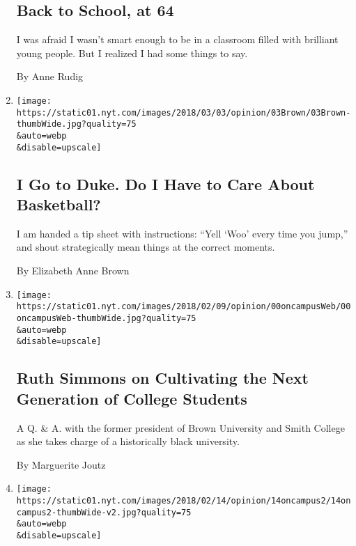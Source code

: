 \begin{enumerate}
  \hypertarget{back-to-school-at-64}{%
  \subsection{Back to School, at 64}\label{back-to-school-at-64}}

  I was afraid I wasn't smart enough to be in a classroom filled with
  brilliant young people. But I realized I had some things to say.

  By Anne Rudig
\item
  \href{/2018/03/02/opinion/duke-basketball-fans.html}{}

  \texttt{[image: https://static01.nyt.com/images/2018/03/03/opinion/03Brown/03Brown-thumbWide.jpg?quality=75\\\&auto=webp\\\&disable=upscale]}

  \hypertarget{i-go-to-duke-do-i-have-to-care-about-basketball}{%
  \subsection{I Go to Duke. Do I Have to Care About
  Basketball?}\label{i-go-to-duke-do-i-have-to-care-about-basketball}}

  I am handed a tip sheet with instructions: ``Yell `Woo' every time you
  jump,'' and shout strategically mean things at the correct moments.

  By Elizabeth Anne Brown
\item
  \href{/2018/02/28/opinion/hbcu-ruth-simmons-interview.html}{}

  \texttt{[image: https://static01.nyt.com/images/2018/02/09/opinion/00oncampusWeb/00oncampusWeb-thumbWide.jpg?quality=75\\\&auto=webp\\\&disable=upscale]}

  \hypertarget{ruth-simmons-on-cultivating-the-next-generation-of-college-students}{%
  \subsection{Ruth Simmons on Cultivating the Next Generation of College
  Students}\label{ruth-simmons-on-cultivating-the-next-generation-of-college-students}}

  A Q. \& A. with the former president of Brown University and Smith
  College as she takes charge of a historically black university.

  By Marguerite Joutz
\item
  \href{/2018/02/14/opinion/you-up-college-in-the-age-of-tinder.html}{}

  \texttt{[image: https://static01.nyt.com/images/2018/02/14/opinion/14oncampus2/14oncampus2-thumbWide-v2.jpg?quality=75\\\&auto=webp\\\&disable=upscale]}


\end{enumerate}

